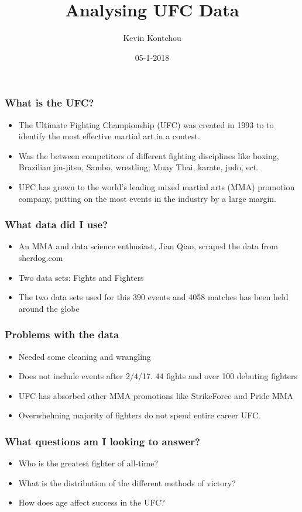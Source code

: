 \documentclass{beamer}
\title{Analysing UFC Data}
\author{Kevin Kontchou}
\institute{DScourseS18}
\date{05-1-2018}
\begin{document}
\frame{\titlepage}

\begin{frame}
\frametitle{What is the UFC?}
\begin{itemize}
  \item The Ultimate Fighting Championship (UFC) was created in 1993 to to identify the most effective martial art in a contest.
  \item Was the between competitors of different fighting disciplines like boxing, Brazilian jiu-jitsu, Sambo, wrestling, Muay Thai, karate, judo, ect.
  \item UFC has grown to the world's leading mixed martial arts (MMA) promotion company, putting on the most events in the industry by a large margin.
\end{itemize}

\end{frame}

\begin{frame}
\frametitle{What data did I use?}
\begin{itemize}
  \item An MMA and data science enthusiast, Jian Qiao, scraped the data from sherdog.com
  \item Two data sets: Fights and Fighters
  \item The two data sets used for this 390 events and 4058 matches has been held around the globe
\end{itemize}
\end{frame}

\begin{frame}
\frametitle{Problems with the data}
\begin{itemize}
    \item Needed some cleaning and wrangling
    \item Does not include events after 2/4/17. 44 fights and over 100 debuting fighters
    \item UFC has absorbed other MMA promotions like StrikeForce and Pride MMA
    \item Overwhelming majority of fighters do not spend entire career UFC.
\end{itemize}
\end{frame}

\begin{frame}
\frametitle{What questions am I looking to answer?}
\begin{itemize}
\item Who is the greatest fighter of all-time?
\item What is the distribution of the different methods of victory?
\item How does age affect success in the UFC?
\end{itemize}
\end{frame}
\end{document}
